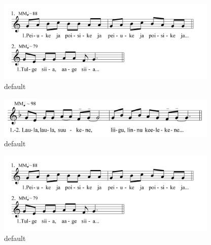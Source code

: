 \begin{figure}[htbp]
\begin{center}
\includegraphics[width=300pt]{figures/045.png}
\caption{default}
\label{default}
\end{center}
\end{figure}






\begin{figure}[htbp]
\begin{center}
\includegraphics[width=300pt]{figures/055.png}
\caption{default}
\label{default}
\end{center}
\end{figure}



\begin{figure}[htbp]
\begin{center}
\includegraphics[width=300pt]{figures/045.png}
\caption{default}
\label{default}
\end{center}
\end{figure}